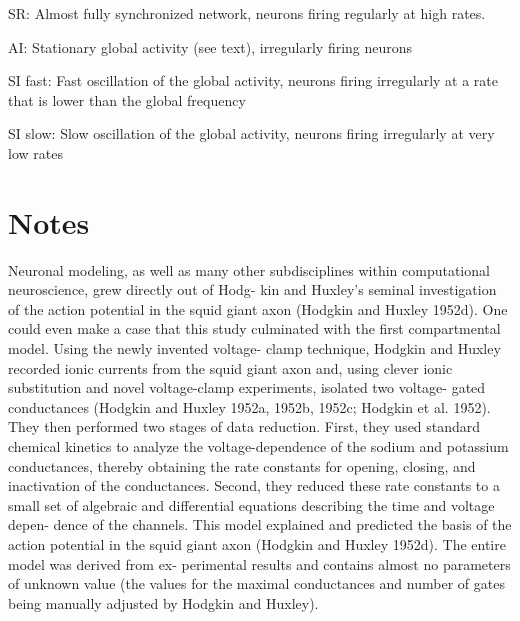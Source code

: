SR: Almost fully synchronized network, neurons firing regularly at high rates.

AI: Stationary global activity (see text), irregularly firing neurons

SI fast: Fast oscillation of the global activity, neurons firing irregularly at a rate that is lower than the global frequency

SI slow: Slow oscillation of the global activity, neurons firing irregularly at very low rates



\section{Notes}

Neuronal modeling, as well as many other subdisciplines within computational neuroscience, grew directly out of Hodg- kin and Huxley’s seminal investigation of the action potential in the squid giant axon (Hodgkin and Huxley 1952d). One could even make a case that this study culminated with the first compartmental model. Using the newly invented voltage- clamp technique, Hodgkin and Huxley recorded ionic currents from the squid giant axon and, using clever ionic substitution and novel voltage-clamp experiments, isolated two voltage- gated conductances (Hodgkin and Huxley 1952a, 1952b, 1952c; Hodgkin et al. 1952). They then performed two stages of data reduction. First, they used standard chemical kinetics to analyze the voltage-dependence of the sodium and potassium conductances, thereby obtaining the rate constants for opening, closing, and inactivation of the conductances. Second, they reduced these rate constants to a small set of algebraic and differential equations describing the time and voltage depen- dence of the channels. This model explained and predicted the basis of the action potential in the squid giant axon (Hodgkin and Huxley 1952d). The entire model was derived from ex- perimental results and contains almost no parameters of unknown value (the values for the maximal conductances and number of gates being manually adjusted by Hodgkin and Huxley).


